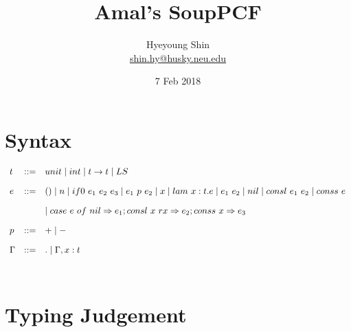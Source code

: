 \documentclass{article}
\title{Amal's SoupPCF}
\author{Hyeyoung Shin\\
  \url{shin.hy@husky.neu.edu}}
\date{7 Feb 2018}
\begin{document}

\maketitle

\section{Syntax}

$\begin{array}{l c l}
  t    & ::= & unit \mid int \mid t \rightarrow t \mid LS\\[1em]
  e    & ::= & () \mid n \mid if0~e_1~e_2~e_3 \mid e_1~p~e_2 \mid x \mid lam~x:t.e \mid e_1~e_2 \mid nil \mid consl~e_1~e_2 \mid conss~e\\[1em]
       &     &  \mid case~e~of~nil \Rightarrow e_1; consl~x~rx \Rightarrow e_2; conss~x \Rightarrow e_3\\[1em]
  p    & ::= & + \mid -\\[1em]
  \Gamma & ::= & . \mid \Gamma,x:t\\[2em]
\end{array}$


\section{Typing Judgement}
\end{document}
